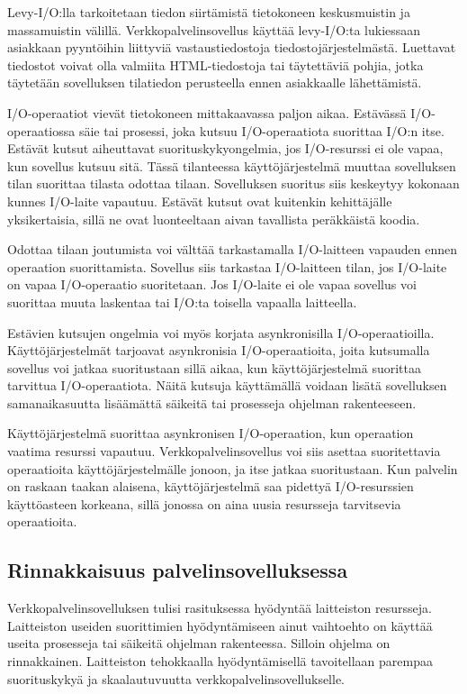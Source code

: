 \documentclass[finnish]{tktltiki2}
\theoremstyle{definition}
\theoremstyle{remark}
\begin{document}
Levy-I/O:lla tarkoitetaan tiedon siirtämistä
tietokoneen keskusmuistin ja massamuistin välillä.
Verkkopalvelinsovellus käyttää levy-I/O:ta lukiessaan
asiakkaan pyyntöihin liittyviä vastaustiedostoja tiedostojärjestelmästä.
Luettavat tiedostot voivat olla valmiita HTML-tiedostoja tai täytettäviä
pohjia, jotka täytetään sovelluksen tilatiedon perusteella ennen
asiakkaalle lähettämistä.

I/O-operaatiot vievät tietokoneen mittakaavassa paljon
aikaa. Estävässä I/O-operaatiossa säie tai prosessi,
joka kutsuu I/O-operaatiota suorittaa I/O:n itse.
Estävät kutsut aiheuttavat suorituskykyongelmia, jos
I/O-resurssi ei ole vapaa, kun sovellus kutsuu sitä.
Tässä tilanteessa käyttöjärjestelmä muuttaa sovelluksen
tilan suorittaa tilasta odottaa tilaan. Sovelluksen suoritus
siis keskeytyy kokonaan kunnes I/O-laite vapautuu.
Estävät kutsut ovat kuitenkin kehittäjälle yksikertaisia, sillä
ne ovat luonteeltaan aivan tavallista peräkkäistä
koodia.

Odottaa tilaan joutumista voi välttää tarkastamalla
I/O-laitteen vapauden ennen operaation suorittamista.
Sovellus siis tarkastaa I/O-laitteen tilan, jos
I/O-laite on vapaa I/O-operaatio suoritetaan. Jos I/O-laite
ei ole vapaa sovellus voi suorittaa muuta laskentaa tai I/O:ta
toisella vapaalla laitteella.

Estävien kutsujen ongelmia voi myös korjata asynkronisilla I/O-operaatioilla.
Käyttöjärjestelmät tarjoavat asynkronisia I/O-operaatioita, joita kutsumalla
sovellus voi jatkaa suoritustaan sillä aikaa, kun käyttöjärjestelmä
suorittaa tarvittua I/O-operaatiota. Näitä kutsuja käyttämällä voidaan
lisätä sovelluksen samanaikasuutta lisäämättä säikeitä
tai prosesseja ohjelman rakenteeseen.

Käyttöjärjestelmä suorittaa asynkronisen I/O-operaation,
kun operaation vaatima resurssi vapautuu. Verkkopalvelinsovellus
voi siis asettaa suoritettavia operaatioita käyttöjärjestelmälle
jonoon, ja itse jatkaa suoritustaan. Kun palvelin
on raskaan taakan alaisena, käyttöjärjestelmä saa pidettyä
I/O-resurssien käyttöasteen korkeana, sillä jonossa on aina
uusia resursseja tarvitsevia operaatioita.

\subsection{Rinnakkaisuus palvelinsovelluksessa}
Verkkopalvelinsovelluksen tulisi rasituksessa hyödyntää 
laitteiston resursseja. Laitteiston useiden suorittimien
hyödyntämiseen ainut vaihtoehto on käyttää
useita prosesseja tai säikeitä ohjelman rakenteessa.
Silloin ohjelma on rinnakkainen.
Laitteiston tehokkaalla hyödyntämisellä
tavoitellaan parempaa 
suorituskykyä ja skaalautuvuutta
verkkopalvelinsovellukselle.
\end{document}
